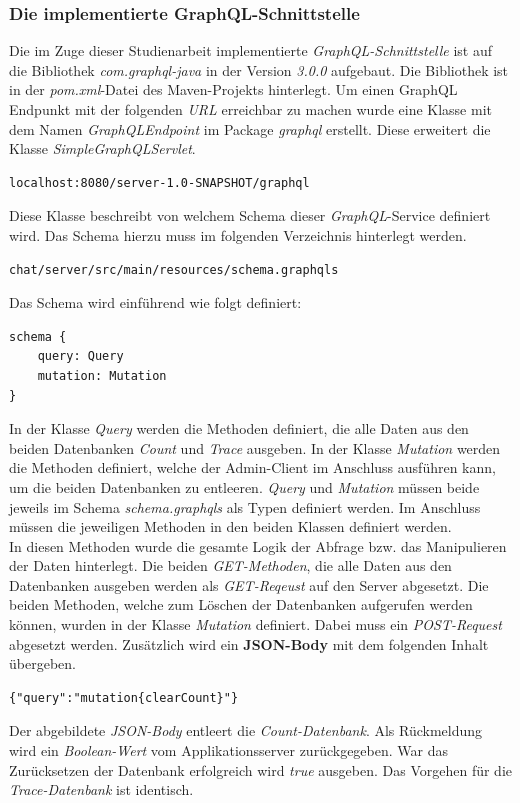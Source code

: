 \documentclass[10pt,journal,compsoc]{IEEEtran}
\begin{document}
\subsubsection{Die implementierte GraphQL-Schnittstelle}
Die im Zuge dieser Studienarbeit implementierte \textit{GraphQL-Schnittstelle} ist auf die  Bibliothek \textit{com.graphql-java} in der Version \textit{3.0.0} aufgebaut. Die Bibliothek ist in der \textit{pom.xml}-Datei des Maven-Projekts hinterlegt. Um einen GraphQL Endpunkt mit der folgenden \textit{URL} erreichbar zu machen wurde eine Klasse mit dem Namen \textit{GraphQLEndpoint} im Package \textit{graphql} erstellt. Diese erweitert die Klasse \textit{SimpleGraphQLServlet}.
\begin{lstlisting}
localhost:8080/server-1.0-SNAPSHOT/graphql
\end{lstlisting}
Diese Klasse beschreibt von welchem Schema dieser \textit{GraphQL}-Service definiert wird. Das Schema hierzu muss im folgenden Verzeichnis hinterlegt werden. 
\begin{lstlisting}
chat/server/src/main/resources/schema.graphqls
\end{lstlisting}
Das Schema wird einführend wie folgt definiert:
\begin{lstlisting}
schema {
	query: Query
	mutation: Mutation
}
\end{lstlisting}
In der Klasse \textit{Query} werden die Methoden definiert, die alle Daten aus den beiden Datenbanken \textit{Count} und \textit{Trace} ausgeben. In der Klasse \textit{Mutation} werden die Methoden definiert, welche der Admin-Client im Anschluss ausführen kann, um die beiden Datenbanken zu entleeren. \textit{Query} und \textit{Mutation} müssen beide jeweils im Schema \textit{schema.graphqls} als Typen definiert werden. Im Anschluss müssen die jeweiligen Methoden in den beiden Klassen definiert werden. \\
In diesen Methoden wurde die gesamte Logik der Abfrage bzw. das Manipulieren der Daten hinterlegt. Die beiden \textit{GET-Methoden}, die alle Daten aus den Datenbanken ausgeben werden als \textit{GET-Reqeust} auf den Server abgesetzt. Die beiden Methoden, welche zum Löschen der Datenbanken aufgerufen werden können, wurden in der Klasse \textit{Mutation} definiert. Dabei muss ein \textit{POST-Request} abgesetzt werden. Zusätzlich wird ein \textbf{JSON-Body} mit dem folgenden Inhalt übergeben.
\begin{lstlisting}
{"query":"mutation{clearCount}"}
\end{lstlisting}
Der abgebildete \textit{JSON-Body} entleert die \textit{Count-Datenbank}. Als Rückmeldung wird ein \textit{Boolean-Wert} vom Applikationsserver zurückgegeben. War das Zurücksetzen der Datenbank erfolgreich wird \textit{true} ausgeben. Das Vorgehen für die \textit{Trace-Datenbank} ist identisch.\\ \\ \\
\end{document}
